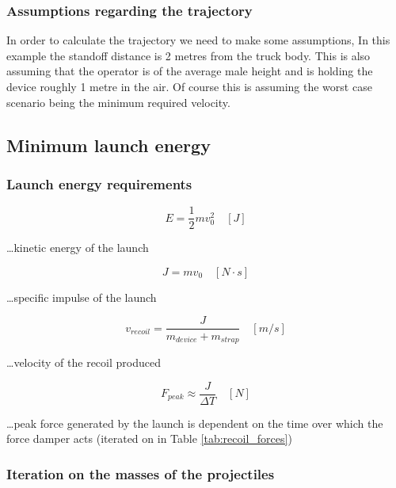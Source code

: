 \documentclass[a4paper,10pt]{article}
\begin{document}
\subsubsection{Assumptions regarding the trajectory}

In order to calculate the trajectory we need to make some assumptions, In this example the standoff distance is 2 metres from the truck body. This is also assuming that the operator is of the average male height and is holding the device roughly 1 metre in the air. Of course this is assuming the worst case scenario being the minimum required velocity.

\subsection{Minimum launch energy}

\subsubsection{Launch energy requirements}

\begin{equation}
    E = \frac{1}{2}mv^2_0 \quad [J]
\end{equation}

\ldots kinetic energy of the launch

\begin{equation}
    J = mv_0 \quad [N \cdot s]
\end{equation}

\ldots specific impulse of the launch

\begin{equation}
    v_{recoil} = \frac{J}{m_{device}+m_{strap}} \quad [m/s]
\end{equation}

\ldots velocity of the recoil produced

\begin{equation}
    F_{peak} \approx \frac{J}{\Delta T} \quad [N]
\end{equation}

\ldots peak force generated by the launch is dependent on the time over which the force damper acts (iterated on in Table \ref{tab:recoil_forces})

\newpage

\subsubsection{Iteration on the masses of the projectiles}
\end{document}
